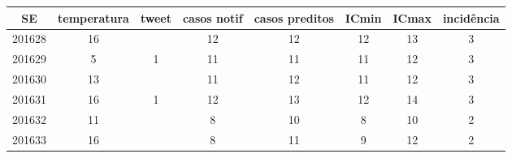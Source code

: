 \begin{tabular}{c|ccccccc}
  \hline
SE & temperatura & tweet & casos notif & casos preditos & ICmin & ICmax & incidência \\ 
  \hline
201628 & 16 &  & 12 & 12 & 12 & 13 & 3 \\ 
  201629 & 5 & 1 & 11 & 11 & 11 & 12 & 3 \\ 
  201630 & 13 &  & 11 & 12 & 11 & 12 & 3 \\ 
  201631 & 16 & 1 & 12 & 13 & 12 & 14 & 3 \\ 
  201632 & 11 &  & 8 & 10 & 8 & 10 & 2 \\ 
  201633 & 16 &  & 8 & 11 & 9 & 12 & 2 \\ 
   \hline
\end{tabular}
